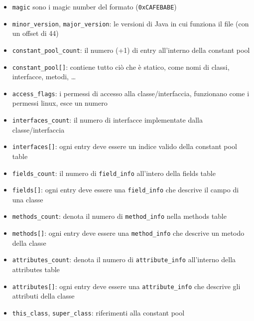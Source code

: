 \begin{itemize}
    \item \texttt{magic} sono i magic number del formato (\texttt{0xCAFEBABE})

    \item \texttt{minor\_version}, \texttt{major\_version}: le versioni di Java in cui funziona il file (con un offset di 44)

    \item \texttt{constant\_pool\_count}: il numero (+1) di entry all'interno della constant pool

    \item \texttt{constant\_pool[]}: contiene tutto ciò che è statico, come nomi di classi, interfacce, metodi, \dots

    \item \texttt{access\_flags}: i permessi di accesso alla classe/interfaccia, funzionano come i permessi linux, esce un numero

    \item \texttt{interfaces\_count}: il numero di interfacce implementate dalla classe/interfaccia

    \item \texttt{interfaces[]}: ogni entry deve essere un indice valido della constant pool table

    \item \texttt{fields\_count}: il numero di \texttt{field\_info} all'intero della fields table

    \item \texttt{fields[]}: ogni entry deve essere una \texttt{field\_info} che descrive il campo di una classe

    \item \texttt{methods\_count}: denota il numero di \texttt{method\_info} nella methods table

    \item \texttt{methods[]}: ogni entry deve essere una \texttt{method\_info} che descrive un metodo della classe

    \item \texttt{attributes\_count}: denota il numero di \texttt{attribute\_info} all'interno della attributes table

    \item \texttt{attributes[]}: ogni entry deve essere una \texttt{attribute\_info} che descrive gli attributi della classe

    \item \texttt{this\_class}, \texttt{super\_class}: riferimenti alla constant pool
\end{itemize}


